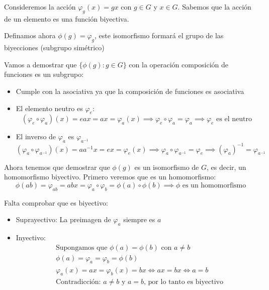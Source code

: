 \documentclass[a4paper,12pt]{article}
\begin{document}
\begin{enumerate}
    Consideremos la acción $\varphi_g(x)=gx$ con $g \in G$ y $x \in G$. Sabemos que la acción de un elemento es una función biyectiva.

    Definamos ahora $\phi(g)=\varphi_g$, este isomorfismo formará el grupo de las biyecciones (subgrupo simétrico)

    Vamos a demostrar que $\{\phi(g):g \in G\}$ con la operación composición de funciones es un subgrupo:

    \begin{itemize}
        \item Cumple con la asociativa ya que la composición de funciones es asociativa
        \item El elemento neutro es $\varphi_e$:
        $$
        (\varphi_{e} \circ \varphi_{a})(x) = eax = ax = \varphi_a(x) \implies \varphi_{e} \circ \varphi_{a} = \varphi_{a} \implies \varphi_e \text{ es el neutro}
        $$
        \item El inverso de $\varphi_a$ es $\varphi_{a^{-1}}$
        $$
        (\varphi_a \circ \varphi_{a^{-1}})(x) = aa^{-1}x = ex = \varphi_e(x) \implies \varphi_a \circ \varphi_{a^{-1}} = \varphi_e \implies (\varphi_a)^{-1} = \varphi_{a^{-1}}  
        $$
    \end{itemize}

    Ahora tenemos que demostrar que $\phi(g)$ es un isomorfismo de $G$, es decir, un homomorfismo biyectivo. Primero veremos que es un homomorfismo:
    $$
    \phi (ab) = \varphi_{ab} = abx = \varphi_a \circ \varphi_b = \phi(a) \circ \phi(b) \implies \phi \text{ es un homomorfismo}
    $$

    Falta comprobar que es biyectivo:
    \begin{itemize}
        \item Suprayectivo: La preimagen de $\varphi_a$ siempre es $a$
        \item Inyectivo:
        \begin{equation*}
            \begin{split}
                & \text{Supongamos que } \phi(a) = \phi(b) \text{ con } a\neq b\\
                & \phi (a) = \varphi_a = \varphi_b = \phi(b)\\
                & \varphi_a(x) = ax = \varphi_b(x) = bx \iff ax = bx \iff a = b\\
                & \text{Contradicción: } a\neq b \text{ y } a=b \text{, por lo tanto es biyectivo}
            \end{split} 
        \end{equation*}
    \end{itemize}


\end{enumerate}
\end{document}
